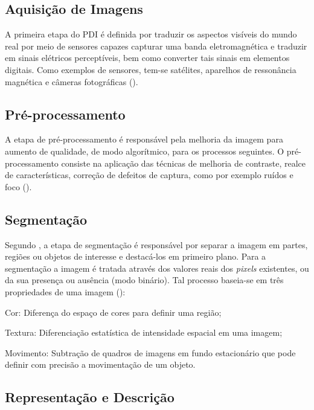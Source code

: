 \documentclass[12pt,oneside,a4paper,chapter=TITLE,section=TITLE,sumario=tradicional]{abntex2}
\begin{document}
\subsection{Aquisição de Imagens}

A primeira etapa do PDI é definida por traduzir os aspectos visíveis do mundo real por meio de sensores capazes capturar uma banda eletromagnética e traduzir em sinais elétricos perceptíveis, bem como converter tais sinais em elementos digitais. Como exemplos de sensores, tem-se satélites, aparelhos de ressonância magnética e câmeras fotográficas ().

\subsection{Pré-processamento}

A etapa de pré-processamento é responsável pela melhoria da imagem para aumento de qualidade, de modo algorítmico, para os processos seguintes. O pré-processamento consiste na aplicação das técnicas de melhoria de contraste, realce de características, correção de defeitos de captura, como por exemplo ruídos e foco ().

\subsection{Segmentação}

Segundo , a etapa de segmentação é responsável por separar a imagem em partes, regiões ou objetos de interesse e destacá-los em primeiro plano. Para a segmentação a imagem é tratada através dos valores reais dos \textit{pixels} existentes, ou da sua presença ou ausência (modo binário). Tal processo baseia-se em três propriedades de uma imagem ():
\begin{lista}
    \item Cor: Diferença do espaço de cores para definir uma região;
    \item Textura: Diferenciação estatística de intensidade espacial em uma imagem;
    \item Movimento: Subtração de quadros de imagens em fundo estacionário que pode definir com precisão a movimentação de um objeto.
\end{lista}

\subsection{Representação e Descrição}
\end{document}
